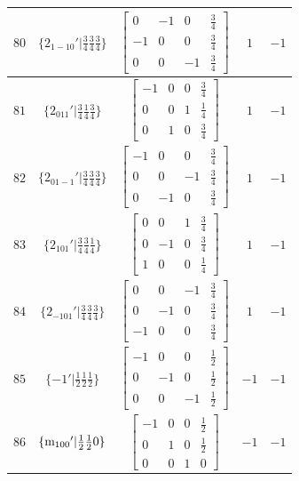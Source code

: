 \documentclass[fleqn,8pt]{jsarticle}
\begin{document}
\begin{longtable}{ccccc}
$ 80 $ & $ \{2{}_{1-10}{}'|\frac{3}{4} \frac{3}{4} \frac{3}{4}\} $ & $ \begin{bmatrix} 0 & -1 & 0 & \frac{3}{4} \\ -1 & 0 & 0 & \frac{3}{4} \\ 0 & 0 & -1 & \frac{3}{4} \end{bmatrix} $ & $ 1 $ & $ -1 $ \\ \hline
$ 81 $ & $ \{2{}_{011}{}'|\frac{3}{4} \frac{1}{4} \frac{3}{4}\} $ & $ \begin{bmatrix} -1 & 0 & 0 & \frac{3}{4} \\ 0 & 0 & 1 & \frac{1}{4} \\ 0 & 1 & 0 & \frac{3}{4} \end{bmatrix} $ & $ 1 $ & $ -1 $ \\ \hline
$ 82 $ & $ \{2{}_{01-1}{}'|\frac{3}{4} \frac{3}{4} \frac{3}{4}\} $ & $ \begin{bmatrix} -1 & 0 & 0 & \frac{3}{4} \\ 0 & 0 & -1 & \frac{3}{4} \\ 0 & -1 & 0 & \frac{3}{4} \end{bmatrix} $ & $ 1 $ & $ -1 $ \\ \hline
$ 83 $ & $ \{2{}_{101}{}'|\frac{3}{4} \frac{3}{4} \frac{1}{4}\} $ & $ \begin{bmatrix} 0 & 0 & 1 & \frac{3}{4} \\ 0 & -1 & 0 & \frac{3}{4} \\ 1 & 0 & 0 & \frac{1}{4} \end{bmatrix} $ & $ 1 $ & $ -1 $ \\ \hline
$ 84 $ & $ \{2{}_{-101}{}'|\frac{3}{4} \frac{3}{4} \frac{3}{4}\} $ & $ \begin{bmatrix} 0 & 0 & -1 & \frac{3}{4} \\ 0 & -1 & 0 & \frac{3}{4} \\ -1 & 0 & 0 & \frac{3}{4} \end{bmatrix} $ & $ 1 $ & $ -1 $ \\ \hline
$ 85 $ & $ \{-1{}'|\frac{1}{2} \frac{1}{2} \frac{1}{2}\} $ & $ \begin{bmatrix} -1 & 0 & 0 & \frac{1}{2} \\ 0 & -1 & 0 & \frac{1}{2} \\ 0 & 0 & -1 & \frac{1}{2} \end{bmatrix} $ & $ -1 $ & $ -1 $ \\ \hline
$ 86 $ & $ \{{\rm m}_{100}{}'|\frac{1}{2} \frac{1}{2} 0\} $ & $ \begin{bmatrix} -1 & 0 & 0 & \frac{1}{2} \\ 0 & 1 & 0 & \frac{1}{2} \\ 0 & 0 & 1 & 0 \end{bmatrix} $ & $ -1 $ & $ -1 $ \\ \hline

\end{longtable}
\end{document}
